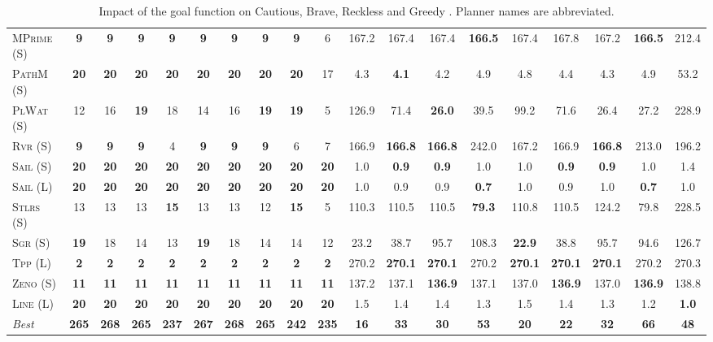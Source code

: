 \begin{table}[tb]
{\begin{tabular}{|l||ccccccccc||ccccccccc||}
\textsc{MPrime} (S)&\textbf{9}&\textbf{9}&\textbf{9}&\textbf{9}&\textbf{9}&\textbf{9}&\textbf{9}&\textbf{9}&6&167.2&167.4&167.4&\textbf{166.5}&167.4&167.8&167.2&\textbf{166.5}&212.4\\
\textsc{PathM} (S)&\textbf{20}&\textbf{20}&\textbf{20}&\textbf{20}&\textbf{20}&\textbf{20}&\textbf{20}&\textbf{20}&17&4.3&\textbf{4.1}&4.2&4.9&4.8&4.4&4.3&4.9&53.2\\
\textsc{PlWat} (S)&12&16&\textbf{19}&18&14&16&\textbf{19}&\textbf{19}&5&126.9&71.4&\textbf{26.0}&39.5&99.2&71.6&26.4&27.2&228.9\\
\textsc{Rvr} (S)&\textbf{9}&\textbf{9}&\textbf{9}&4&\textbf{9}&\textbf{9}&\textbf{9}&6&7&166.9&\textbf{166.8}&\textbf{166.8}&242.0&167.2&166.9&\textbf{166.8}&213.0&196.2\\
\textsc{Sail} (S)&\textbf{20}&\textbf{20}&\textbf{20}&\textbf{20}&\textbf{20}&\textbf{20}&\textbf{20}&\textbf{20}&\textbf{20}&1.0&\textbf{0.9}&\textbf{0.9}&1.0&1.0&\textbf{0.9}&\textbf{0.9}&1.0&1.4\\
\textsc{Sail} (L)&\textbf{20}&\textbf{20}&\textbf{20}&\textbf{20}&\textbf{20}&\textbf{20}&\textbf{20}&\textbf{20}&\textbf{20}&1.0&0.9&0.9&\textbf{0.7}&1.0&0.9&1.0&\textbf{0.7}&1.0\\
\textsc{Stlrs} (S)&13&13&13&\textbf{15}&13&13&12&\textbf{15}&5&110.3&110.5&110.5&\textbf{79.3}&110.8&110.5&124.2&79.8&228.5\\
\textsc{Sgr} (S)&\textbf{19}&18&14&13&\textbf{19}&18&14&14&12&23.2&38.7&95.7&108.3&\textbf{22.9}&38.8&95.7&94.6&126.7\\
\textsc{Tpp} (L)&\textbf{2}&\textbf{2}&\textbf{2}&\textbf{2}&\textbf{2}&\textbf{2}&\textbf{2}&\textbf{2}&\textbf{2}&270.2&\textbf{270.1}&\textbf{270.1}&270.2&\textbf{270.1}&\textbf{270.1}&\textbf{270.1}&270.2&270.3\\
\textsc{Zeno} (S)&\textbf{11}&\textbf{11}&\textbf{11}&\textbf{11}&\textbf{11}&\textbf{11}&\textbf{11}&\textbf{11}&\textbf{11}&137.2&137.1&\textbf{136.9}&137.1&137.0&\textbf{136.9}&137.0&\textbf{136.9}&138.8\\
\textsc{Line} (L)&\textbf{20}&\textbf{20}&\textbf{20}&\textbf{20}&\textbf{20}&\textbf{20}&\textbf{20}&\textbf{20}&\textbf{20}&1.5&1.4&1.4&1.3&1.5&1.4&1.3&1.2&\textbf{1.0}
\\\hline
\textit{Best}&\textbf{265}&\textbf{268}&\textbf{265}&\textbf{237}&\textbf{267}&\textbf{268}&\textbf{265}&\textbf{242}&\textbf{235}&\textbf{16}&\textbf{33}&\textbf{30}&\textbf{53}&\textbf{20}&\textbf{22}&\textbf{32}&\textbf{66}&\textbf{48}\\\hline

        \end{tabular}}
        \caption{Impact of the goal function on Cautious, Brave, Reckless and Greedy \pattyd. Planner names are abbreviated.}
        \label{tab:abl-gf}
        \end{table}
        